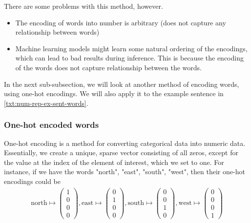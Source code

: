 There are some problems with this method, however.
\begin{itemize}
    \item The encoding of words into number is arbitrary (does not capture any relationship between words)
    \item Machine learning models might learn some natural ordering of the encodings, which can lead to bad results during inference. This is because the encoding of the words does not capture relationship between the words.
\end{itemize}

In the next sub-subsection, we will look at another method of encoding words, using one-hot encodings. We will also apply it to the example sentence in \cref{txt:num-rep-ex-sent-words}.

\subsubsection{One-hot encoded words}
One-hot encoding is a method for converting categorical data into numeric data. Essentially, we create a unique, sparse vector consisting of all zeros, except for the value at the index of the element of interest, which we set to one. For instance, if we have the words "north", "east", "south", "west", then their one-hot encodings could be
\begin{align}
    \text{north} \mapsto \begin{pmatrix}
    1\\
    0\\
    0\\
    0
    \end{pmatrix},
    \text{east} \mapsto \begin{pmatrix}
    0\\
    1\\
    0\\
    0
    \end{pmatrix},
    \text{south} \mapsto \begin{pmatrix}
    0\\
    0\\
    1\\
    0
    \end{pmatrix},
    \text{west} \mapsto \begin{pmatrix}
    0\\
    0\\
    0\\
    1
    \end{pmatrix}
\end{align}


